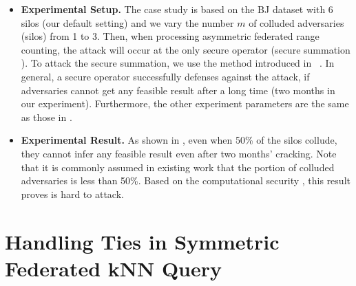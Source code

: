 \begin{itemize}
    \item \textbf{Experimental Setup.} The case study is based on the BJ dataset with 6 silos (\ie our default setting) and we vary the number $m$  of colluded adversaries (\ie silos) from 1 to 3. Then, when processing asymmetric federated range counting, the attack will occur at the only secure operator (\ie secure summation \cite{DBLP:journals/dke/EmekciSAA07}). To attack the secure summation, we use the method introduced in ~\cite{DBLP:journals/dke/EmekciSAA07}. In general, a secure operator successfully defenses against the attack, if adversaries cannot get any feasible result after a long time (\eg two months in our experiment). Furthermore, the other experiment parameters are the same as those in .
    
    \item \textbf{Experimental Result.} 
    As shown in , even when 50\% of the silos collude, they cannot infer any feasible result even after two months' cracking.
    Note that it is commonly assumed in existing work that the portion of colluded adversaries is less than 50\%.
    Based on the computational security \cite{DBLP:reference/dbsec/2008,goldreich2009foundations,DBLP:conf/ccs/Bayatbabolghani18}, this result proves \sysname is hard to attack.
\end{itemize}

\section{Handling Ties in Symmetric Federated kNN Query}
\label{app:knn-tie}

